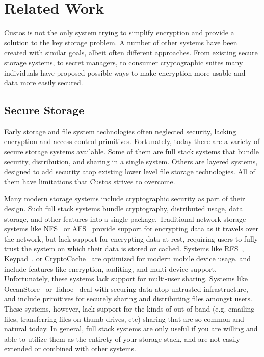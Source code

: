 \section{Related Work}

Custos is not the only system trying to simplify encryption and
provide a solution to the key storage problem. A number of other
systems have been created with similar goals, albeit often different
approaches. From existing secure storage systems, to secret managers,
to consumer cryptographic suites many individuals have proposed
possible ways to make encryption more usable and data more easily
secured.

\subsection{Secure Storage}

Early storage and file system technologies often neglected security,
lacking encryption and access control primitives. Fortunately, today
there are a variety of secure storage systems available. Some of them
are full stack systems that bundle security, distribution, and sharing
in a single system. Others are layered systems, designed to add
security atop existing lower level file storage technologies. All of
them have limitations that Custos strives to overcome.

Many modern storage systems include cryptographic security as part of
their design. Such full stack systems bundle cryptography, distributed
usage, data storage, and other features into a single
package. Traditional network storage systems like
NFS~\cite{Sandberg1985} or AFS~\cite{Howard1988} provide support for
encrypting data as it travels over the network, but lack support for
encrypting data at rest, requiring users to fully trust the system on
which their data is stored or cached. Systems like
RFS~\cite{Dong2011}, Keypad~\cite{Geambasu2011}, or
CryptoCache~\cite{Jensen2000} are optimized for modern mobile device
usage, and include features like encryption, auditing, and
multi-device support. Unfortunately, these systems lack support for
multi-user sharing. Systems like OceanStore~\cite{Kubiatowicz2000} or
Tahoe~\cite{Wilcox-O'Hearn2008} deal with securing data atop untrusted
infrastructure, and include primitives for securely sharing and
distributing files amongst users. These systems, however, lack support
for the kinds of out-of-band (e.g. emailing files, transferring files
on thumb drives, etc) sharing that are so common and natural today. In
general, full stack systems are only useful if you are willing and
able to utilize them as the entirety of your storage stack, and are
not easily extended or combined with other systems.

